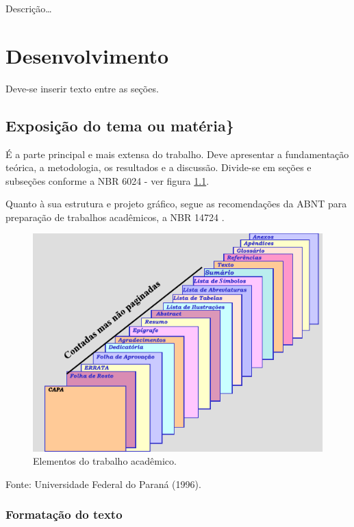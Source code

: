 \documentclass[
	12pt,				%
	oneside,			%
	a4paper,			%
	chapter=TITLE,		%
	section=TITLE,		%
	english,			%
	brazil				%
	]{abntex2}
\newcommand{\bcenter}{\begin{center}}
\newcommand{\ecenter}{\end{center}}
\begin{document}
Descrição\ldots{}

\hypertarget{desenvolvimento}{%
\chapter{Desenvolvimento}\label{desenvolvimento}}

Deve-se inserir texto entre as seções.

\hypertarget{exposiuxe7uxe3o-do-tema-ou-matuxe9ria}{%
\section{Exposição do tema ou matéria\}}\label{exposiuxe7uxe3o-do-tema-ou-matuxe9ria}}

É a parte principal e mais extensa do trabalho. Deve apresentar a fundamentação
teórica, a metodologia, os resultados e a discussão. Divide-se em seções e
subseções conforme a NBR 6024 \autocite*{NBR6024:2012} - ver figura \ref{fig:imagem}.

Quanto à sua estrutura e projeto gráfico, segue as recomendações da \gls{ABNT}
para preparação de trabalhos acadêmicos, a NBR 14724 \autocite*{NBR14724:2011}.
\begin{figure}[H]

{\centering \includegraphics[width=0.7\linewidth]{images/imagem} 

}

\caption{Elementos do trabalho acadêmico.}\label{fig:imagem}
\end{figure}
\bcenter

Fonte: Universidade Federal do Paraná (1996).
\ecenter

\hypertarget{formatauxe7uxe3o-do-texto}{%
\subsection{Formatação do texto}\label{formatauxe7uxe3o-do-texto}}
\end{document}
